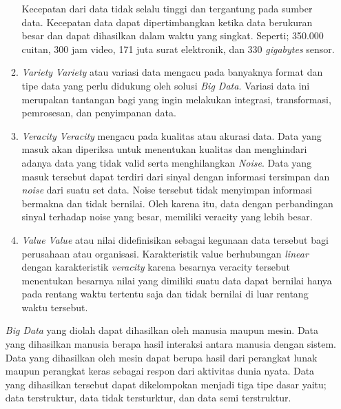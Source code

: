 \documentclass[a4paper,twoside]{article}
\begin{document}
\begin{enumerate}
\begin{enumerate}
{		Kecepatan dari data tidak selalu tinggi dan tergantung pada sumber data. Kecepatan data 				dapat dipertimbangkan ketika data berukuran besar dan dapat dihasilkan dalam waktu yang 				singkat. Seperti; 350.000 cuitan, 300 jam video, 171 juta surat elektronik, dan 330 					\textit{gigabytes} sensor.
	
		}
	
		\item{\textit{Variety} \newline
		\textit{Variety} atau variasi data mengacu pada banyaknya format dan tipe data yang perlu 				didukung oleh solusi \textit{Big Data}. Variasi data ini merupakan tantangan bagi yang 					ingin melakukan integrasi, transformasi, pemrosesan, dan penyimpanan data.
		}
	
		\item{\textit{Veracity} \newline
		\textit{Veracity} mengacu pada kualitas atau akurasi data. Data yang masuk akan diperiksa 				untuk menentukan kualitas dan menghindari adanya data yang tidak valid serta menghilangkan 				\textit{Noise}. Data yang masuk tersebut dapat terdiri dari sinyal dengan informasi 					tersimpan dan \textit{noise} dari suatu set data. Noise tersebut tidak menyimpan informasi 				bermakna dan tidak bernilai. Oleh karena itu, data dengan perbandingan sinyal terhadap 					noise yang besar, memiliki veracity yang lebih besar. 	
		}
	
		\item{\textit{Value} \newline
		\textit{Value} atau nilai didefinisikan sebagai kegunaan data tersebut bagi perusahaan atau 			organisasi. Karakteristik value berhubungan \textit{linear} dengan karakteristik 						\textit{veracity} karena besarnya veracity tersebut menentukan besarnya nilai yang dimiliki 			suatu data dapat bernilai hanya pada rentang waktu tertentu saja dan tidak bernilai di luar 			rentang waktu tersebut.
		}
		
		\end{enumerate}
		
		\textit{Big Data} yang diolah dapat dihasilkan oleh manusia maupun mesin. Data yang 					dihasilkan manusia berapa hasil interaksi antara manusia dengan sistem. Data yang dihasilkan 		oleh mesin dapat berupa hasil dari perangkat lunak maupun perangkat keras sebagai respon 				dari aktivitas dunia nyata. Data yang dihasilkan tersebut dapat dikelompokan menjadi tiga 				tipe dasar yaitu; data terstruktur, data tidak tersturktur, dan data semi terstruktur.
		

\end{enumerate}
\end{document}
